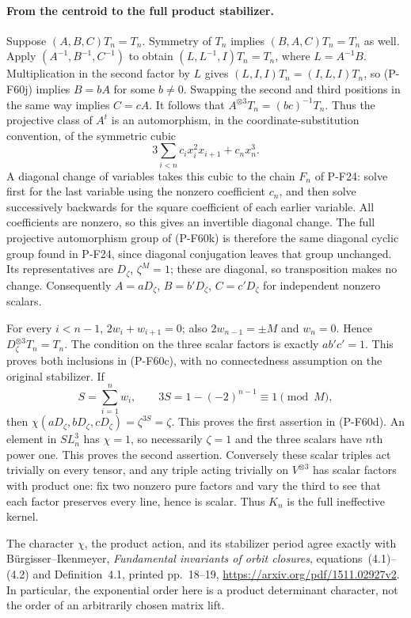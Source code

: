 \paragraph{From the centroid to the full product stabilizer.}
Suppose $(A,B,C)T_n=T_n$.  Symmetry of $T_n$ implies
$(B,A,C)T_n=T_n$ as well.  Apply $(A^{-1},B^{-1},C^{-1})$
to obtain
$(L,L^{-1},I)T_n=T_n$, where $L=A^{-1}B$.
Multiplication in the second factor by $L$ gives
$(L,I,I)T_n=(I,L,I)T_n$, so (P-F60j) implies
$B=bA$ for some $b\ne0$.  Swapping the second and third
positions in the same way implies $C=cA$.
It follows that $A^{\otimes3}T_n=(bc)^{-1}T_n$.
Thus the projective class of $A^t$ is an automorphism,
in the coordinate-substitution convention, of the symmetric cubic
\[
                   3\sum_{i<n}c_i x_i^2x_{i+1}+c_nx_n^3.
                                                        \tag{P-F60k}
\]
A diagonal change of variables takes this cubic to the
chain $F_n$ of P-F24: solve first for the last variable
using the nonzero coefficient $c_n$, and then solve
successively backwards for the square coefficient of
each earlier variable.  All coefficients are nonzero,
so this gives an invertible diagonal change.  The full
projective automorphism group of (P-F60k) is therefore
the same diagonal cyclic group found in P-F24, since
diagonal conjugation leaves that group unchanged.
Its representatives are $D_\zeta$, $\zeta^M=1$;
these are diagonal, so transposition makes no change.
Consequently $A=aD_\zeta$, $B=b'D_\zeta$,
$C=c'D_\zeta$ for independent nonzero scalars.

For every $i<n-1$, $2w_i+w_{i+1}=0$; also
$2w_{n-1}=\pm M$ and $w_n=0$.  Hence
$D_\zeta^{\otimes3}T_n=T_n$.  The condition on the
three scalar factors is exactly $ab'c'=1$.
This proves both inclusions in (P-F60c), with no
connectedness assumption on the original stabilizer.
If
\[
                S=\sum_{i=1}^{n}w_i,
           \qquad 3S=1-(-2)^{n-1}\equiv1\pmod M,
\]
then $\chi(aD_\zeta,bD_\zeta,cD_\zeta)=\zeta^{3S}=\zeta$.
This proves the first assertion in (P-F60d).
An element in $SL_n^3$ has $\chi=1$, so necessarily
$\zeta=1$ and the three scalars have $n$th power one.
This proves the second assertion.  Conversely these
scalar triples act trivially on every tensor, and any
triple acting trivially on $V^{\otimes3}$ has scalar
factors with product one: fix two nonzero pure factors
and vary the third to see that each factor preserves
every line, hence is scalar.  Thus $K_n$ is the full
ineffective kernel.

The character $\chi$, the product action, and its
stabilizer period agree exactly with B\"urgisser--Ikenmeyer,
\emph{Fundamental invariants of orbit closures},
equations~(4.1)--(4.2) and Definition~4.1, printed
pp.~18--19, \url{https://arxiv.org/pdf/1511.02927v2}.
In particular, the exponential order here is a product
determinant character, not the order of an arbitrarily
chosen matrix lift.

